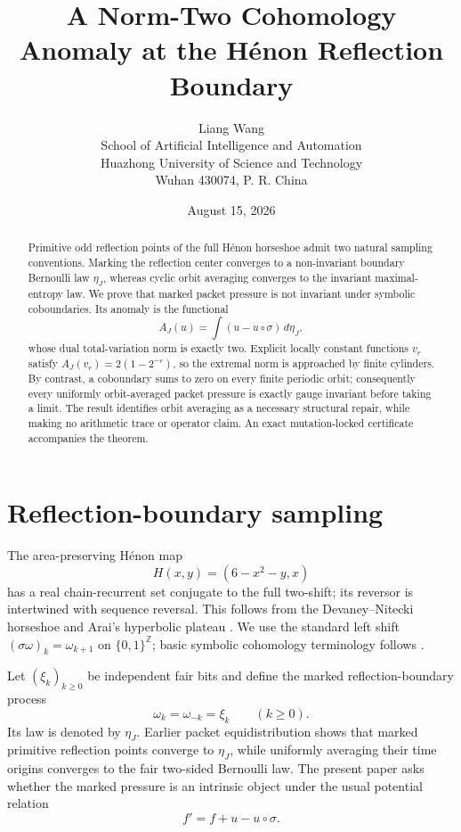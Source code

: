 \documentclass[11pt]{article}
\title{A Norm-Two Cohomology Anomaly at the H\'enon Reflection Boundary}
\author{Liang Wang\\\small School of Artificial Intelligence and Automation\\\small Huazhong University of Science and Technology\\\small Wuhan 430074, P. R. China}
\date{August 15, 2026}
\begin{document}
\maketitle

\begin{abstract}
Primitive odd reflection points of the full H\'enon horseshoe admit two
natural sampling conventions.  Marking the reflection center converges to a
non-invariant boundary Bernoulli law $\eta_J$, whereas cyclic orbit averaging
converges to the invariant maximal-entropy law.  We prove that marked packet
pressure is not invariant under symbolic coboundaries.  Its anomaly is the
functional
\[
 A_J(u)=\int (u-u\circ\sigma)\,d\eta_J,
\]
whose dual total-variation norm is exactly two.  Explicit locally constant
functions $v_r$ satisfy $A_J(v_r)=2(1-2^{-r})$, so the extremal norm is
approached by finite cylinders.  By contrast, a coboundary sums to zero on
every finite periodic orbit; consequently every uniformly orbit-averaged
packet pressure is exactly gauge invariant before taking a limit.  The
result identifies orbit averaging as a necessary structural repair, while
making no arithmetic trace or operator claim.  An exact mutation-locked
certificate accompanies the theorem.
\end{abstract}

\section{Reflection-boundary sampling}

The area-preserving H\'enon map
\[
 H(x,y)=(6-x^2-y,x)
\]
has a real chain-recurrent set conjugate to the full two-shift; its reversor
is intertwined with sequence reversal.  This follows from the
Devaney--Nitecki horseshoe and Arai's hyperbolic plateau
\cite{DevaneyNitecki1979,Arai2007}.  We use the standard left shift
$(\sigma\omega)_k=\omega_{k+1}$ on $\{0,1\}^{\mathbb Z}$; basic symbolic
cohomology terminology follows \citet{LindMarcus1995}.

Let $(\xi_k)_{k\geq0}$ be independent fair bits and define the marked
reflection-boundary process
\begin{equation}\label{eq:eta}
 \omega_k=\omega_{-k}=\xi_k \qquad (k\geq0).
\end{equation}
Its law is denoted by $\eta_J$.  Earlier packet equidistribution shows that
marked primitive reflection points converge to $\eta_J$, while uniformly
averaging their time origins converges to the fair two-sided Bernoulli law.
The present paper asks whether the marked pressure is an intrinsic object
under the usual potential relation
\begin{equation}\label{eq:cohomology}
 f' = f+u-u\circ\sigma.
\end{equation}
\end{document}
